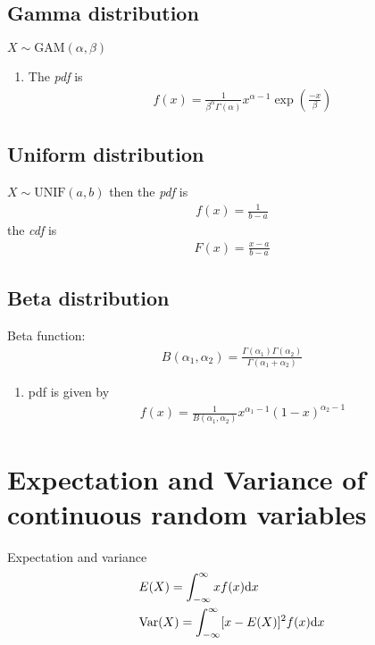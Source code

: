 \documentclass[16pt,a4paper]{article}
\begin{document}
\subsection{Gamma distribution}
$X\sim \text{GAM}(\alpha, \beta)$
\begin{enumerate}[(1)]
    \item The \textit{pdf} is 
        \begin{align*}
            f(x) = \frac{1}{\beta^\alpha \Gamma(\alpha)}x^{\alpha - 1}\exp(\frac{-x}{\beta})
        \end{align*}
\end{enumerate}
\subsection{Uniform distribution}
$X\sim \text{UNIF}(a,b)$ then the \textit{pdf} is
\begin{align*}
    f(x) = \frac{1}{b-a}
\end{align*}
the \textit{cdf} is 
\begin{align*}
    F(x) = \frac{x-a}{b-a}
\end{align*}
\newpage
\subsection{Beta distribution}
Beta function: 
\begin{align*}
    B(\alpha_1, \alpha_2) = \frac{\Gamma(\alpha_1)\Gamma(\alpha_2)}{\Gamma(\alpha_1+\alpha_2)}
\end{align*}
\begin{enumerate}[(1)]
    \item pdf is given by 
        \begin{align*}
            f(x) = \frac{1}{B(\alpha_1, \alpha_2)}x^{\alpha_1-1}(1-x)^{\alpha_2-1}
        \end{align*}
\end{enumerate}
\section{Expectation and Variance of continuous random variables}
\begin{defn}{Expectation and variance}
    \begin{align*}
        &E(X) = \int_{-\infty}^\infty xf(x) \dd x\\
        &\mathrm{Var}(X) = \int_{-\infty}^{\infty} [x-E(X)]^2f(x) \dd x
    \end{align*}
\end{defn}
\newpage
\end{document}
